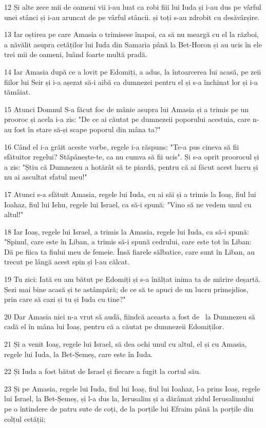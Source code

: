 \par 12 Și alte zece mii de oameni vii i-au luat ca robi fiii lui Iuda și i-au dus pe vârful unei stânci și i-au aruncat de pe vârful stâncii. și toți s-au zdrobit cu desăvârșire.
\par 13 Iar oștirea pe care Amasia o trimisese înapoi, ca să nu meargă cu el la război, a năvălit asupra cetăților lui Iuda din Samaria până la Bet-Horon și au ucis în ele trei mii de oameni, luând foarte multă pradă.
\par 14 Iar Amasia după ce a lovit pe Edomiți, a adus, la întoarcerea lui acasă, pe zeii fiilor lui Seir și i-a așezat să-i aibă ca dumnezei pentru el și s-a închinat lor și i-a tămâiat.
\par 15 Atunci Domnul S-a făcut foc de mânie asupra lui Amasia și a trimis pe un prooroc și acela i-a zis: "De ce ai căutat pe dumnezeii poporului acestuia, care n-au fost în stare să-și scape poporul din mâna ta?"
\par 16 Când el i-a grăit aceste vorbe, regele i-a răspuns: "Te-a pus cineva să fii sfătuitor regelui? Stăpânește-te, ca nu cumva să fii ucis". Și s-a oprit proorocul și a zis: "Știu că Dumnezeu a hotărât să te piardă, pentru că ai făcut acest lucru și nu ai ascultat sfatul meu!"
\par 17 Atunci s-a sfătuit Amasia, regele lui Iuda, cu ai săi și a trimis la Ioaș, fiul lui Ioahaz, fiul lui Iehu, regele lui Israel, ca să-i spună: "Vino să ne vedem unul cu altul!"
\par 18 Iar Ioaș, regele lui Israel, a trimis la Amasia, regele lui Iuda, ca să-i spună: "Spinul, care este în Liban, a trimis să-i spună cedrului, care este tot în Liban: Dă pe fiica ta fiului meu de femeie. Însă fiarele sălbatice, care sunt în Liban, au trecut pe lângă acest spin și l-au călcat.
\par 19 Tu zici: Iată eu am bătut pe Edomiți și s-a înălțat inima ta de mărire deșartă. Șezi mai bine acasă și te astâmpără; de ce să te apuci de un lucru primejdios, prin care să cazi și tu și Iuda cu tine?"
\par 20 Dar Amasia nici n-a vrut să audă, fiindcă aceasta a fost de  la Dumnezeu să cadă el în mâna lui Ioaș, pentru că a căutat pe dumnezeii Edomiților.
\par 21 Și a venit Ioaș, regele lui Israel, să dea ochi unul cu altul, el și cu Amasia, regele lui Iuda, la Bet-Șemeș, care este în Iuda.
\par 22 Și Iuda a fost bătut de Israel și fiecare a fugit la cortul său.
\par 23 Și pe Amasia, regele lui Iuda, fiul lui Ioaș, fiul lui Ioahaz, l-a prins Ioaș, regele lui Israel, la Bet-Șemeș, și l-a dus la, Ierusalim și a dărâmat zidul Ierusalimului pe o întindere de patru sute de coți, de la porțile lui Efraim până la porțile din colțul cetății;

